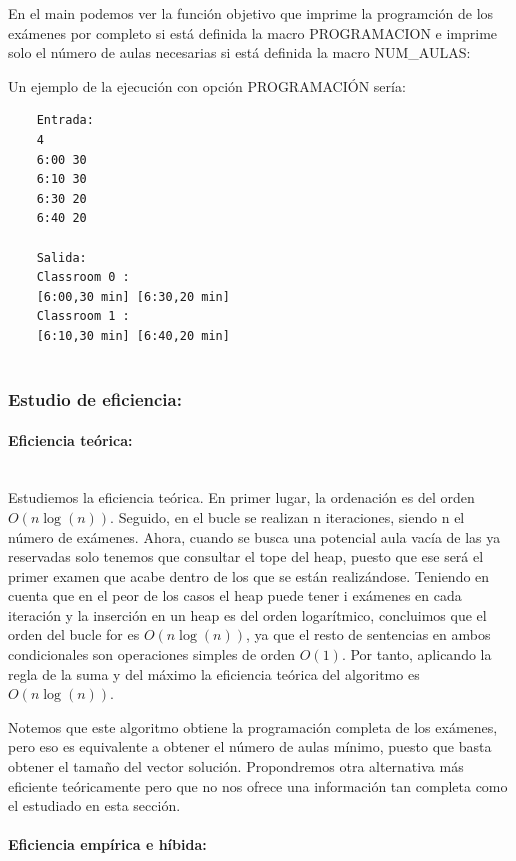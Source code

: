 \documentclass{article}
\newcommand{\myparagraph}[1]{\paragraph{#1}\mbox{}\\}
\begin{document}
    En el main podemos ver la función objetivo que imprime la programción
    de los exámenes por completo si está definida la macro PROGRAMACION
    e imprime solo el número de aulas necesarias si está definida la macro 
    NUM\_AULAS:

    

    Un ejemplo de la ejecución con opción PROGRAMACIÓN sería: 

    \begin{verbatim}
    Entrada:      
    4
    6:00 30
    6:10 30
    6:30 20
    6:40 20
    
    Salida:  
    Classroom 0 : 
    [6:00,30 min] [6:30,20 min] 
    Classroom 1 : 
    [6:10,30 min] [6:40,20 min] 
    
    \end{verbatim}

    \subsubsection{Estudio de eficiencia: }

    \myparagraph{Eficiencia teórica: }

    Estudiemos la eficiencia teórica. En primer lugar, la ordenación es del orden $O(n \log (n))$. Seguido, en el bucle se realizan n iteraciones, siendo n el número de exámenes. Ahora, cuando se busca una potencial aula vacía de las ya reservadas solo tenemos que consultar el tope del heap, puesto que ese será el primer examen que acabe dentro de los que se están realizándose. Teniendo en cuenta que en el peor de los casos el heap puede tener i exámenes en cada iteración y la inserción en un heap es del orden logarítmico, concluimos que el orden del bucle for es $O(n \log (n))$, ya que el resto de sentencias en ambos condicionales son operaciones simples de orden $O(1)$. Por tanto, aplicando la regla de la suma y del máximo la eficiencia teórica del algoritmo es $O(n \log (n))$. 
    
    Notemos que este algoritmo obtiene la programación completa de los exámenes, pero eso es equivalente a obtener el número de aulas mínimo, 
    puesto que basta obtener el tamaño del vector solución. Propondremos otra alternativa más eficiente teóricamente pero que no nos ofrece 
    una información tan completa como el estudiado en esta sección.

    \myparagraph{Eficiencia empírica e híbida: }
    
\end{document}
